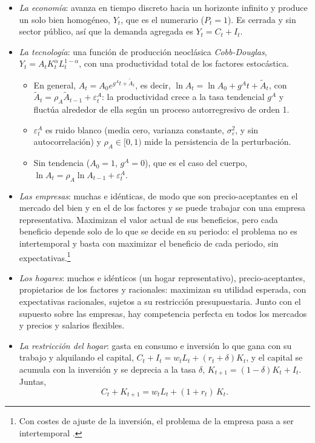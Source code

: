 \documentclass[11pt]{article}
\begin{document}
\begin{itemize}
\item \emph{La economía}: avanza en tiempo discreto hacia un horizonte infinito y produce un solo bien homogéneo, $Y_t$, que es el numerario ($P_t=1$). Es cerrada y sin sector público, así que la demanda agregada es $Y_t=C_t+I_t$.
\item \emph{La tecnología}: una función de producción neoclásica \emph{Cobb-Douglas}, $Y_t=A_tK_t^{\alpha}L_t^{1-\alpha}$, con una productividad total de los factores estocástica.
  \begin{itemize}
  \item En general, $A_t=A_0e^{g^At+\tilde A_t}$, es decir, $\ln A_t=\ln A_0+g^At+\tilde A_t$, con $\tilde A_t=\rho_A\tilde A_{t-1}+\varepsilon^A_t$: la productividad crece a la tasa tendencial $g^A$ y fluctúa alrededor de ella según un proceso autorregresivo de orden 1.
  \item $\varepsilon^A_t$ es ruido blanco (media cero, varianza constante, $\sigma_\varepsilon^2$, y sin autocorrelación) y $\rho_A\in[0,1)$ mide la persistencia de la perturbación.
  \item Sin tendencia ($A_0=1$, $g^A=0$), que es el caso del cuerpo, $\ln A_t=\rho_A\ln A_{t-1}+\varepsilon^A_t$.
  \end{itemize}
\item \emph{Las empresas}: muchas e idénticas, de modo que son precio-aceptantes en el mercado del bien y en el de los factores y se puede trabajar con una empresa representativa. Maximizan el valor actual de sus beneficios, pero cada beneficio depende solo de lo que se decide en su periodo: el problema no es intertemporal y basta con maximizar el beneficio de cada periodo, sin expectativas.\footnote{Con costes de ajuste de la inversión, el problema de la empresa pasa a ser intertemporal .}
\item \emph{Los hogares}: muchos e idénticos (un hogar representativo), precio-aceptantes, propietarios de los factores y racionales: maximizan su utilidad esperada, con expectativas racionales, sujetos a su restricción presupuestaria. Junto con el supuesto sobre las empresas, hay competencia perfecta en todos los mercados y precios y salarios flexibles.
\item \emph{La restricción del hogar}: gasta en consumo e inversión lo que gana con su trabajo y alquilando el capital, $C_t+I_t=w_tL_t+(r_t+\delta)K_t$, y el capital se acumula con la inversión y se deprecia a la tasa $\delta$, $K_{t+1}=(1-\delta)K_t+I_t$. Juntas,
  \begin{equation*}
  C_t+K_{t+1}=w_tL_t+(1+r_t)\,K_t .
  \end{equation*}
\end{itemize}
\end{document}
